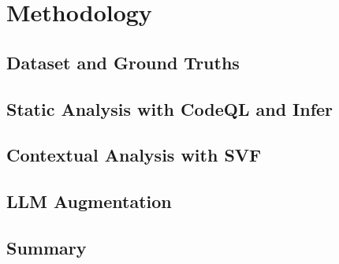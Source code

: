 \newpage
\section{Methodology}
\label{sec:methodology}


\subsection{Dataset and Ground Truths}
\label{sec:methodology:sub:dataset}


\subsection{Static Analysis with CodeQL and Infer}
\label{sec:methodology:sub:sast}


\subsection{Contextual Analysis with SVF}
\label{sec:methodology:sub:context}


\subsection{LLM Augmentation}
\label{sec:methodology:sub:llm}


\subsection{Summary}
\label{sec:methodology:sub:summary}
